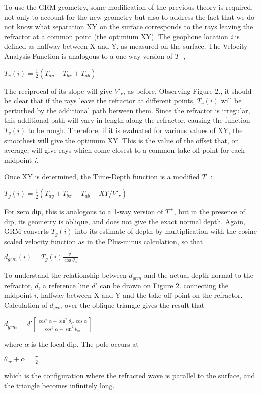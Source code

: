 {To use the GRM geometry, some modification of the previous theory is required,
not only to account for the new geometry but also to address the fact that 
we do not know 
what separation XY on the surface corresponds to the rays leaving the
refractor at a common point (the optimium XY).  The geophone location \textit{i} 
is defined as halfway between X and Y, as measured on the surface.
The Velocity Analysis
Function is analogous to a one-way version of $T^{-}$,
	\begin{center}
	\(T_{v}(i) = \frac{1}{2}(T_{ay}-T_{bx}+T_{ab}) \)
	\end{center}
The reciprocal of its slope will give $V'_{r}$, as before.  Observing
Figure 2., it should 
be clear that if the rays leave the refractor at different points, $T_{v}(i)$
will be perturbed by the additional path between them.  Since the 
refractor is irregular, this additional path will vary in length along
the refractor, causing the function $T_{v}(i)$ to be rough.  Therefore, if it is evaluated
for various values of XY, the smoothest will give the optimum XY.  This
is the value of the offset that, on average, will give rays which come
closest to a common take off point for each midpoint \textit{i}.

Once XY is determined, the Time-Depth function is a modified $T^{+}$:
	\begin{center}
	\(T_{g}(i) = \frac{1}{2}(T_{ay}+T_{bx}-T_{ab}-XY/V'_{r})  \)
	\end{center}
For zero dip, this is analogous to a 1-way version of $T^{+}$, but in the 
presence of dip, its geometry is oblique, and does not give the exact 
normal depth.  Again, GRM converts $T_{g}(i)$ into its estimate of depth 
by multiplication with the cosine scaled velocity function as in the 
Plus-minus calculation, so that
	\begin{center}
	\(d_{grm}(i) = T_{g}(i) \displaystyle{\frac{v_{0}}{\cos\theta_{cr}}} \)
	\end{center}
To understand the relationship between $d_{grm}$ and the actual depth normal
to the refractor, $d$, a reference line $d'$ can be drawn on Figure 2.
connecting the midpoint $i$, halfway between X and Y and the take-off 
point on the refractor.  Calculation of $d_{grm}$ over the oblique triangle
gives the result that 
	\begin{center}
	\( d_{grm} = d' \left[ \displaystyle{\frac{\cos^{2}\alpha - \sin^{2}\theta_{cr}\cos\alpha} 
                       {\cos^{2}\alpha - \sin^{2}\theta_{cr}} }\right]   \) 
	\end{center}
where $\alpha$ is the local dip. The pole occurs at 
	\begin{center}
	\(\theta_{cr} + \alpha = \displaystyle{\frac{\pi}{2}} \)
	\end{center}
which is the configuration where the refracted wave is parallel to the surface,
and the triangle becomes infinitely long.

}

